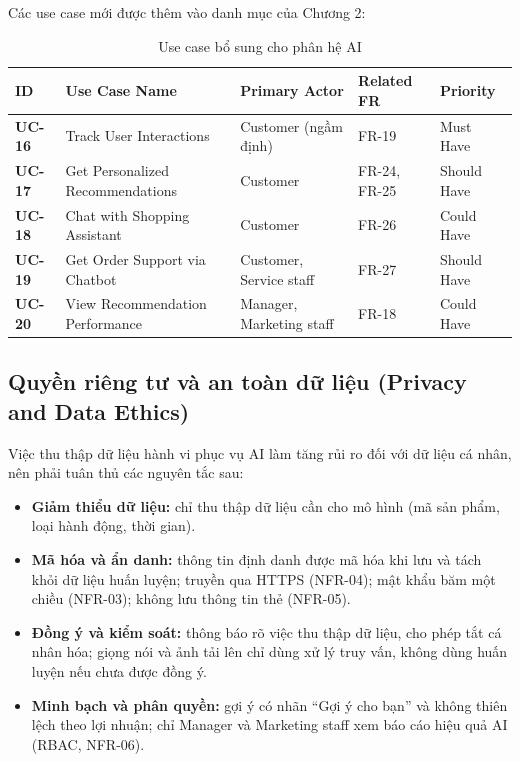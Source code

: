 \documentclass[12pt,a4paper,oneside]{report}
\begin{document}
Các use case mới được thêm vào danh mục của Chương 2:

\begin{longtable}{p{1.6cm}p{5.4cm}p{3.4cm}p{3cm}p{2.6cm}}
\caption{Use case bổ sung cho phân hệ AI}\\
\toprule
\textbf{ID} & \textbf{Use Case Name} & \textbf{Primary Actor} & \textbf{Related FR} & \textbf{Priority} \\
\midrule
\endhead
\bottomrule
\endlastfoot
\textbf{UC-16} & Track User Interactions & Customer (ngầm định) & FR-19 & Must Have \\
\textbf{UC-17} & Get Personalized Recommendations & Customer & FR-24, FR-25 & Should Have \\
\textbf{UC-18} & Chat with Shopping Assistant & Customer & FR-26 & Could Have \\
\textbf{UC-19} & Get Order Support via Chatbot & Customer, Service staff & FR-27 & Should Have \\
\textbf{UC-20} & View Recommendation Performance & Manager, Marketing staff & FR-18 & Could Have \\
\end{longtable}

\subsection{Quyền riêng tư và an toàn dữ liệu (Privacy and Data Ethics)}

Việc thu thập dữ liệu hành vi phục vụ AI làm tăng rủi ro đối với dữ liệu cá nhân, nên phải tuân thủ các nguyên tắc sau:

\begin{itemize}
  \item \textbf{Giảm thiểu dữ liệu:} chỉ thu thập dữ liệu cần cho mô hình (mã sản phẩm, loại hành động, thời gian).
  \item \textbf{Mã hóa và ẩn danh:} thông tin định danh được mã hóa khi lưu và tách khỏi dữ liệu huấn luyện; truyền qua HTTPS (NFR-04); mật khẩu băm một chiều (NFR-03); không lưu thông tin thẻ (NFR-05).
  \item \textbf{Đồng ý và kiểm soát:} thông báo rõ việc thu thập dữ liệu, cho phép tắt cá nhân hóa; giọng nói và ảnh tải lên chỉ dùng xử lý truy vấn, không dùng huấn luyện nếu chưa được đồng ý.
  \item \textbf{Minh bạch và phân quyền:} gợi ý có nhãn ``Gợi ý cho bạn'' và không thiên lệch theo lợi nhuận; chỉ Manager và Marketing staff xem báo cáo hiệu quả AI (RBAC, NFR-06).
\end{itemize}
\end{document}
